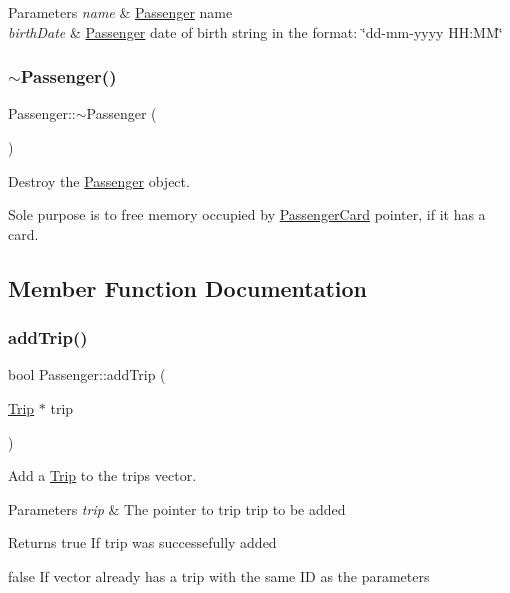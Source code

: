\begin{DoxyParams}{Parameters}
{\em name} & \mbox{\hyperlink{classPassenger}{Passenger}} name \\
\hline
{\em birth\+Date} & \mbox{\hyperlink{classPassenger}{Passenger}} date of birth string in the format\+: \char`\"{}dd-\/mm-\/yyyy H\+H\+:\+M\+M\char`\"{} \\
\hline
\end{DoxyParams}
\mbox{\label{classPassenger_a6a6747cafd45d2c85db2ec4e873be3c7}} 
\subsubsection{\texorpdfstring{$\sim$\+Passenger()}{~Passenger()}}
{\footnotesize\ttfamily Passenger\+::$\sim$\+Passenger (\begin{DoxyParamCaption}{ }\end{DoxyParamCaption})}



Destroy the \mbox{\hyperlink{classPassenger}{Passenger}} object. 

Sole purpose is to free memory occupied by \mbox{\hyperlink{classPassengerCard}{Passenger\+Card}} pointer, if it has a card. 

\subsection{Member Function Documentation}
\mbox{\label{classPassenger_a2fef29e013c88ba7a75d259cebfa655d}} 
\subsubsection{\texorpdfstring{add\+Trip()}{addTrip()}}
{\footnotesize\ttfamily bool Passenger\+::add\+Trip (\begin{DoxyParamCaption}\item[{\mbox{\hyperlink{classTrip}{Trip}} $\ast$}]{trip }\end{DoxyParamCaption})}



Add a \mbox{\hyperlink{classTrip}{Trip}} to the trips vector. 


\begin{DoxyParams}{Parameters}
{\em trip} & The pointer to trip trip to be added \\
\hline
\end{DoxyParams}
\begin{DoxyReturn}{Returns}
true If trip was successefully added 

false If vector already has a trip with the same ID as the parameter\textquotesingle{}s 
\end{DoxyReturn}
\mbox{\label{classPassenger_aa2101584d2f0daf83ef58e0491754395}} 
